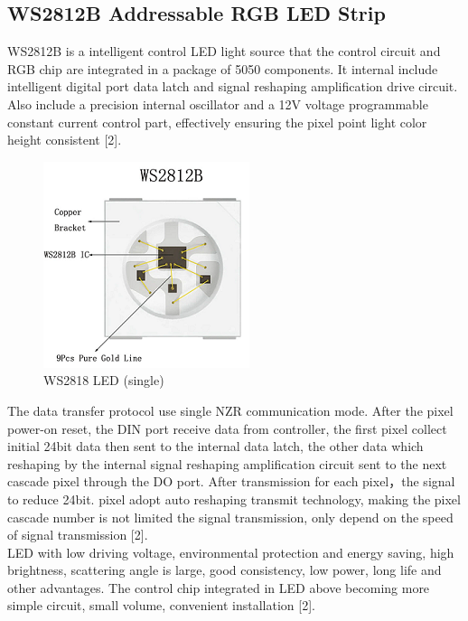 \documentclass[conference]{IEEEtran}
\begin{document}
\subsection{WS2812B Addressable RGB LED Strip}
WS2812B is a intelligent control LED light source that the control circuit and RGB chip are integrated in a package of 5050 components. It internal include intelligent digital port data latch and signal reshaping amplification drive circuit. Also include a precision internal oscillator and a 12V voltage programmable constant current control part, effectively ensuring the pixel point light color height consistent [2]. \\ 

\begin{figure}[htbp]
\centerline{\includegraphics{ws2818b_single.png}}
\caption{WS2818 LED (single)}
\label{fig}
\end{figure}

The data transfer protocol use single NZR communication mode. After the pixel power-on reset, the DIN port receive data from controller, the first pixel collect initial 24bit data then sent to the internal data latch, the other data which reshaping by the internal signal reshaping amplification circuit sent to the next cascade pixel through the DO port. After transmission for each pixel，the signal to reduce 24bit. pixel adopt auto reshaping transmit technology, making the pixel cascade number is not limited the signal transmission, only depend on the speed of signal transmission [2]. \\

LED with low driving voltage, environmental protection and energy saving, high brightness, scattering angle is large, good consistency, low power, long life and other advantages. The control chip integrated in LED above becoming more simple circuit, small volume, convenient installation [2]. \\
\end{document}
